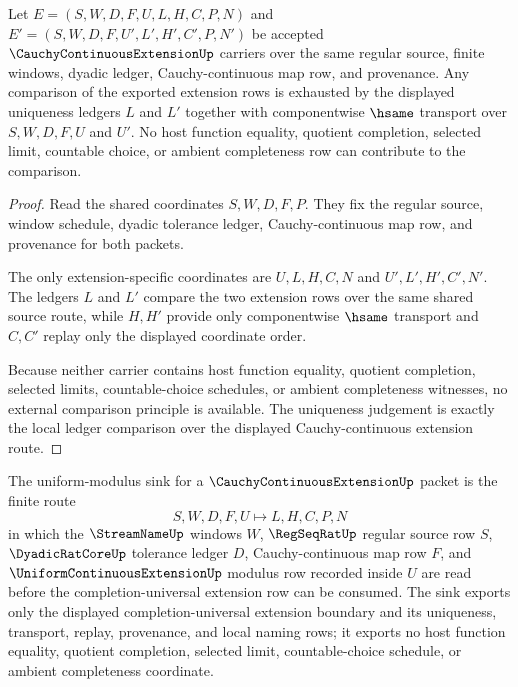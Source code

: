 \begin{theorem}
\label{thm:cauchy-continuous-extension-uniqueness-ledger}
Let $E=(S,W,D,F,U,L,H,C,P,N)$ and $E'=(S,W,D,F,U',L',H',C',P,N')$ be accepted $\CauchyContinuousExtensionUp$ carriers over the same regular source, finite windows, dyadic ledger, Cauchy-continuous map row, and provenance. Any comparison of the exported extension rows is exhausted by the displayed uniqueness ledgers $L$ and $L'$ together with componentwise $\hsame$ transport over $S,W,D,F,U$ and $U'$. No host function equality, quotient completion, selected limit, countable choice, or ambient completeness row can contribute to the comparison.
\end{theorem}
\begin{proof}
Read the shared coordinates $S,W,D,F,P$. They fix the regular source, window schedule, dyadic tolerance ledger, Cauchy-continuous map row, and provenance for both packets.

The only extension-specific coordinates are $U,L,H,C,N$ and $U',L',H',C',N'$. The ledgers $L$ and $L'$ compare the two extension rows over the same shared source route, while $H,H'$ provide only componentwise $\hsame$ transport and $C,C'$ replay only the displayed coordinate order.

Because neither carrier contains host function equality, quotient completion, selected limits, countable-choice schedules, or ambient completeness witnesses, no external comparison principle is available. The uniqueness judgement is exactly the local ledger comparison over the displayed Cauchy-continuous extension route.
\end{proof}

\begin{definition}
\label{def:cauchy-extension-uniform-modulus-sink}
The uniform-modulus sink for a $\CauchyContinuousExtensionUp$ packet is the finite route
$$
S,W,D,F,U \longmapsto L,H,C,P,N
$$
in which the $\StreamNameUp$ windows $W$, $\RegSeqRatUp$ regular source row $S$, $\DyadicRatCoreUp$ tolerance ledger $D$, Cauchy-continuous map row $F$, and $\UniformContinuousExtensionUp$ modulus row recorded inside $U$ are read before the completion-universal extension row can be consumed. The sink exports only the displayed completion-universal extension boundary and its uniqueness, transport, replay, provenance, and local naming rows; it exports no host function equality, quotient completion, selected limit, countable-choice schedule, or ambient completeness coordinate.
\end{definition}

